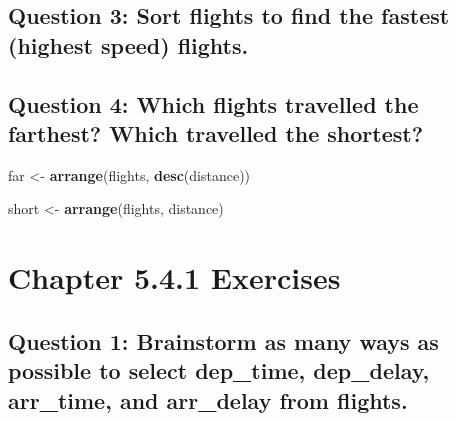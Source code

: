 \documentclass[
]{book}
\newenvironment{Shaded}{\begin{snugshade}}{\end{snugshade}}
\newcommand{\DataTypeTok}[1]{\textcolor[rgb]{0.13,0.29,0.53}{#1}}
\newcommand{\KeywordTok}[1]{\textcolor[rgb]{0.13,0.29,0.53}{\textbf{#1}}}
\newcommand{\NormalTok}[1]{#1}
\newcommand{\OperatorTok}[1]{\textcolor[rgb]{0.81,0.36,0.00}{\textbf{#1}}}
\newcommand{\StringTok}[1]{\textcolor[rgb]{0.31,0.60,0.02}{#1}}
\begin{document}
\hypertarget{question-3-sort-flights-to-find-the-fastest-highest-speed-flights.}{%
\subsection{Question 3: Sort flights to find the fastest (highest speed) flights.}\label{question-3-sort-flights-to-find-the-fastest-highest-speed-flights.}}

\begin{Shaded}
\end{Shaded}

\hypertarget{question-4-which-flights-travelled-the-farthest-which-travelled-the-shortest}{%
\subsection{Question 4: Which flights travelled the farthest? Which travelled the shortest?}\label{question-4-which-flights-travelled-the-farthest-which-travelled-the-shortest}}

\begin{Shaded}
\begin{Highlighting}[]
\NormalTok{far <-}\StringTok{ }\KeywordTok{arrange}\NormalTok{(flights, }\KeywordTok{desc}\NormalTok{(distance))}

\NormalTok{short <-}\StringTok{ }\KeywordTok{arrange}\NormalTok{(flights, distance)}
\end{Highlighting}
\end{Shaded}

\hypertarget{chapter-5.4.1-exercises}{%
\section{Chapter 5.4.1 Exercises}\label{chapter-5.4.1-exercises}}

\hypertarget{question-1-brainstorm-as-many-ways-as-possible-to-select-dep_time-dep_delay-arr_time-and-arr_delay-from-flights.}{%
\subsection{Question 1: Brainstorm as many ways as possible to select dep\_time, dep\_delay, arr\_time, and arr\_delay from flights.}\label{question-1-brainstorm-as-many-ways-as-possible-to-select-dep_time-dep_delay-arr_time-and-arr_delay-from-flights.}}
\end{document}
